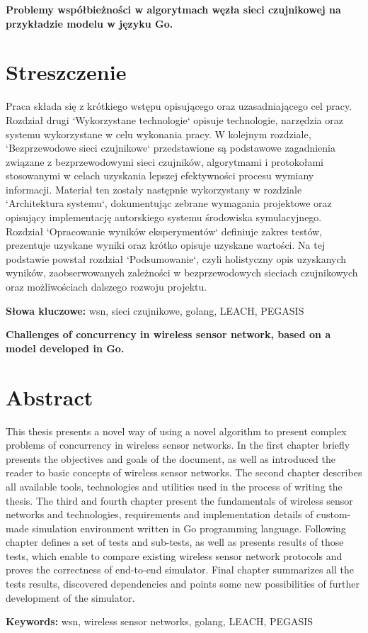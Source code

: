 \newpage
\begin{center}
\large \bf
Problemy współbieżności w algorytmach węzła sieci czujnikowej na przykładzie modelu w języku Go.
\end{center}

\section*{Streszczenie}
Praca składa się z krótkiego wstępu opisującego oraz uzasadniającego cel pracy.
Rozdział drugi `Wykorzystane technologie` opisuje technologie, narzędzia oraz systemu wykorzystane w celu wykonania pracy.
W kolejnym rozdziale, `Bezprzewodowe sieci czujnikowe` przedstawione są podstawowe zagadnienia związane z bezprzewodowymi sieci czujników, algorytmami i protokołami stosowanymi w celach uzyskania lepszej efektywności procesu wymiany informacji.
Materiał ten zostały następnie wykorzystany w rozdziale `Architektura systemu`, dokumentując zebrane wymagania projektowe oraz opisujący implementację autorskiego systemu środowiska symulacyjnego.
Rozdział `Opracowanie wyników eksperymentów` definiuje zakres testów, prezentuje uzyskane wyniki oraz krótko opisuje uzyskane wartości.
Na tej podstawie powstał rozdział `Podsumowanie`, czyli holistyczny opis uzyskanych wyników, zaobserwowanych zależności w bezprzewodowych sieciach czujnikowych oraz możliwościach dalszego rozwoju projektu. 

\bigskip
{\noindent\bf Słowa kluczowe:} wsn, sieci czujnikowe, golang, LEACH, PEGASIS

\vskip 2cm

\cleardoublepage
\newpage
\begin{center}
\large \bf
Challenges of concurrency in wireless sensor network, based on a model developed in Go.
\end{center}

\section*{Abstract}
This thesis presents a novel way of using a novel algorithm to present complex problems of concurrency in wireless sensor networks. 
In the first chapter briefly presents the objectives and goals of the document, as well as introduced the reader to basic concepts of wireless sensor networks.
The second chapter describes all available tools, technologies and utilities used in the process of writing the thesis.
The third and fourth chapter present the fundamentals of wireless sensor networks and technologies, requirements and implementation details of custom-made simulation environment written in Go programming language.
Following chapter defines a set of tests and sub-tests, as well as presents results of those tests, which enable to compare existing wireless sensor network protocols
and proves the correctness of end-to-end simulator.
Final chapter summarizes all the tests results, discovered dependencies and points some new possibilities of further development of the simulator.

\bigskip
{\noindent\bf Keywords:} wsn, wireless sensor networks, golang, LEACH, PEGASIS

\vfill
